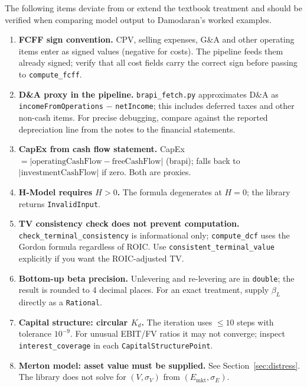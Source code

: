 \documentclass[11pt, a4paper, oneside]{article}
\begin{document}
The following items deviate from or extend the textbook treatment and
should be verified when comparing model output to Damodaran's worked examples.

\begin{enumerate}[leftmargin=*, label=\textbf{\arabic*.}]

\item \textbf{FCFF sign convention.}
  CPV, selling expenses, G\&A and other operating items enter as signed
  values (negative for costs). The pipeline feeds them already signed;
  verify that all cost fields carry the correct sign before passing to
  \texttt{compute\_fcff}.

\item \textbf{D\&A proxy in the pipeline.}
  \texttt{brapi\_fetch.py} approximates D\&A as
  \texttt{incomeFromOperations} $-$ \texttt{netIncome}; this includes
  deferred taxes and other non-cash items. For precise debugging, compare
  against the reported depreciation line from the notes to the financial
  statements.

\item \textbf{CapEx from cash flow statement.}
  CapEx $= |\text{operatingCashFlow} - \text{freeCashFlow}|$ (brapi);
  falls back to $|\text{investmentCashFlow}|$ if zero. Both are proxies.

\item \textbf{H-Model requires $H > 0$.} The formula degenerates at $H = 0$;
  the library returns \texttt{InvalidInput}.

\item \textbf{TV consistency check does not prevent computation.}
  \texttt{check\_terminal\_consistency} is informational only;
  \texttt{compute\_dcf} uses the Gordon formula regardless of ROIC.
  Use \texttt{consistent\_terminal\_value} explicitly if you want the
  ROIC-adjusted TV.

\item \textbf{Bottom-up beta precision.}
  Unlevering and re-levering are in \texttt{double}; the result is rounded
  to 4 decimal places. For an exact treatment, supply
  $\beta_L$ directly as a \texttt{Rational}.

\item \textbf{Capital structure: circular $K_d$.}
  The iteration uses $\leq 10$ steps with tolerance $10^{-9}$.
  For unusual EBIT/FV ratios it may not converge; inspect
  \texttt{interest\_coverage} in each \texttt{CapitalStructurePoint}.

\item \textbf{Merton model: asset value must be supplied.}
  See Section~\ref{sec:distress}. The library does not solve for
  $(V, \sigma_V)$ from $(E_\text{mkt}, \sigma_E)$.


\end{enumerate}
\end{document}
